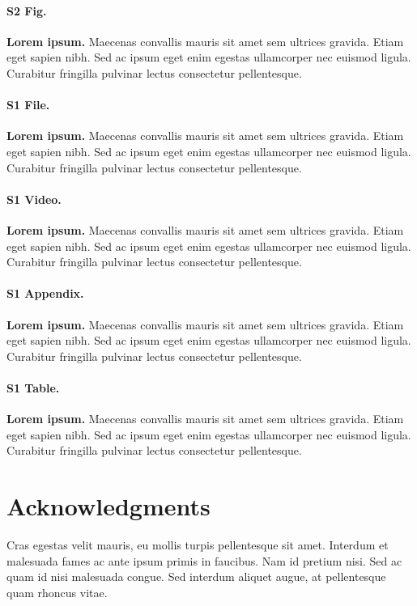 \documentclass[10pt,letterpaper]{article}
\begin{document}
\paragraph*{S2 Fig.}
\label{S2_Fig}
{\bf Lorem ipsum.} Maecenas convallis mauris sit amet sem ultrices gravida. Etiam eget sapien nibh. Sed ac ipsum eget enim egestas ullamcorper nec euismod ligula. Curabitur fringilla pulvinar lectus consectetur pellentesque.

\paragraph*{S1 File.}
\label{S1_File}
{\bf Lorem ipsum.}  Maecenas convallis mauris sit amet sem ultrices gravida. Etiam eget sapien nibh. Sed ac ipsum eget enim egestas ullamcorper nec euismod ligula. Curabitur fringilla pulvinar lectus consectetur pellentesque.

\paragraph*{S1 Video.}
\label{S1_Video}
{\bf Lorem ipsum.}  Maecenas convallis mauris sit amet sem ultrices gravida. Etiam eget sapien nibh. Sed ac ipsum eget enim egestas ullamcorper nec euismod ligula. Curabitur fringilla pulvinar lectus consectetur pellentesque.

\paragraph*{S1 Appendix.}
\label{S1_Appendix}
{\bf Lorem ipsum.} Maecenas convallis mauris sit amet sem ultrices gravida. Etiam eget sapien nibh. Sed ac ipsum eget enim egestas ullamcorper nec euismod ligula. Curabitur fringilla pulvinar lectus consectetur pellentesque.

\paragraph*{S1 Table.}
\label{S1_Table}
{\bf Lorem ipsum.} Maecenas convallis mauris sit amet sem ultrices gravida. Etiam eget sapien nibh. Sed ac ipsum eget enim egestas ullamcorper nec euismod ligula. Curabitur fringilla pulvinar lectus consectetur pellentesque.

\section*{Acknowledgments}
Cras egestas velit mauris, eu mollis turpis pellentesque sit amet. Interdum et malesuada fames ac ante ipsum primis in faucibus. Nam id pretium nisi. Sed ac quam id nisi malesuada congue. Sed interdum aliquet augue, at pellentesque quam rhoncus vitae.
\end{document}
